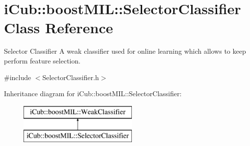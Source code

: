 \section{i\+Cub\+:\+:boost\+M\+I\+L\+:\+:Selector\+Classifier Class Reference}
\label{classiCub_1_1boostMIL_1_1SelectorClassifier}


Selector Classifier A weak classifier used for online learning which allows to keep perform feature selection.  




{\ttfamily \#include $<$Selector\+Classifier.\+h$>$}

Inheritance diagram for i\+Cub\+:\+:boost\+M\+I\+L\+:\+:Selector\+Classifier\+:\begin{figure}[H]
\begin{center}
\leavevmode
\includegraphics[height=2.000000cm]{classiCub_1_1boostMIL_1_1SelectorClassifier}
\end{center}
\end{figure}

